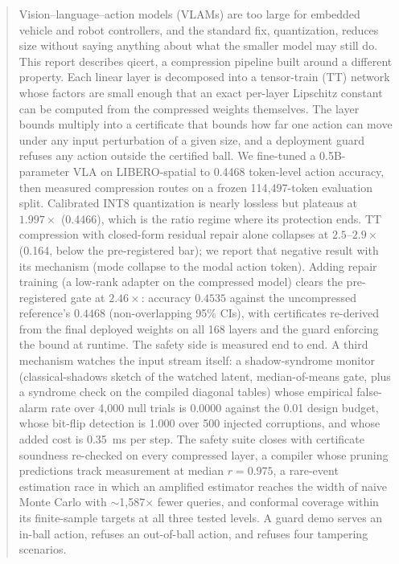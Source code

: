 \documentclass[conference,10pt]{IEEEtran}
\begin{document}
\begin{abstract}
Vision--language--action models (VLAMs) are too large for embedded vehicle and
robot controllers, and the standard fix, quantization, reduces size without
saying anything about what the smaller model may still do. This report describes
qicert, a compression pipeline built around a different property. Each linear
layer is decomposed into a tensor-train (TT) network whose factors are small
enough that an exact per-layer Lipschitz constant can be computed from the
compressed weights themselves. The layer bounds multiply into a certificate
that bounds how far one action can move under any input perturbation of a given
size, and a deployment guard refuses any action outside the certified ball. We
fine-tuned a 0.5B-parameter VLA on LIBERO-spatial to 0.4468 token-level action
accuracy, then measured compression routes on a frozen 114{,}497-token
evaluation split. Calibrated INT8 quantization is nearly lossless but plateaus
at $1.997\times$ (0.4466), which is the ratio regime where its protection ends.
TT compression with closed-form residual repair alone collapses at
$2.5$--$2.9\times$ (0.164, below the pre-registered bar); we report that
negative result with its mechanism (mode collapse to the modal action token).
Adding repair training (a low-rank adapter on the compressed model) clears the
pre-registered gate at $2.46\times$: accuracy $0.4535$ against the uncompressed
reference's $0.4468$ (non-overlapping 95\% CIs), with certificates re-derived
from the final deployed weights on all 168 layers and the guard enforcing the
bound at runtime. The safety side is measured end to end. A third mechanism
watches the input stream itself: a shadow-syndrome monitor (classical-shadows
sketch of the watched latent, median-of-means gate, plus a syndrome check on
the compiled diagonal tables) whose empirical false-alarm rate over 4{,}000
null trials is 0.0000 against the 0.01 design budget, whose bit-flip
detection is 1.000 over 500 injected corruptions, and whose added cost is
0.35~ms per step. The safety suite closes with certificate soundness re-checked
on every compressed layer, a compiler whose
pruning predictions track measurement at median $r = 0.975$, a rare-event
estimation race in which an amplified estimator reaches the width of naive
Monte Carlo with $\sim$1{,}587$\times$ fewer queries, and conformal coverage
within its finite-sample targets at all three tested levels. A guard demo
serves an in-ball action, refuses an out-of-ball action, and refuses four
tampering scenarios.
\end{abstract}
\end{document}
